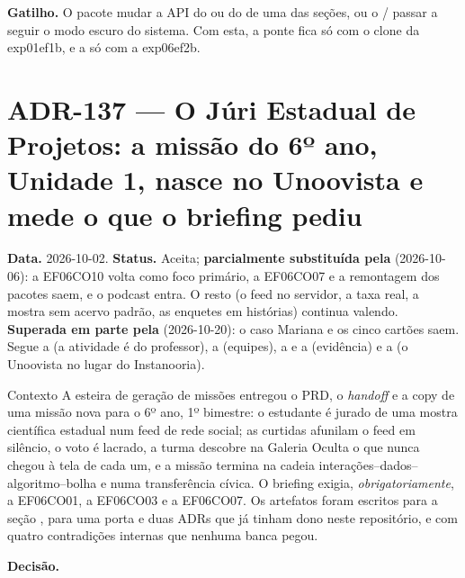 \textbf{Gatilho.} O pacote mudar a API do  ou do
 de uma das seções, ou o / passar
a seguir o modo escuro do sistema. Com esta, a ponte  fica
só com o clone da exp01ef1b, e a  só com a exp06ef2b.

\section{ADR-137 --- O Júri Estadual de Projetos: a missão do 6º ano, Unidade 1, nasce no Unoovista e mede o que o briefing pediu}
\label{adr:exp06ef1b-juri-estadual}

\textbf{Data.} 2026-10-02. \textbf{Status.} Aceita; \textbf{parcialmente
substituída pela } (2026-10-06): a EF06CO10 volta como foco
primário, a EF06CO07 e a remontagem dos pacotes saem, e o podcast entra. O
resto (o feed no servidor, a taxa real, a mostra sem acervo padrão, as
enquetes em histórias) continua valendo. \textbf{Superada em parte pela
} (2026-10-20): o caso Mariana e os cinco cartões saem. Segue a 
(a atividade é do professor), a  (equipes), a  e a
 (evidência) e a  (o Unoovista no lugar do
Instanooria).

\begin{especificacao}{Contexto}
A esteira de geração de missões entregou o PRD, o \emph{handoff} e a copy de
uma missão nova para o 6º ano, 1º bimestre: o estudante é jurado de uma mostra
científica estadual num feed de rede social; as curtidas afunilam o feed em
silêncio, o voto é lacrado, a turma descobre na Galeria Oculta o que nunca
chegou à tela de cada um, e a missão termina na cadeia
interações--dados--algoritmo--bolha e numa transferência cívica. O briefing
exigia, \emph{obrigatoriamente}, a EF06CO01, a EF06CO03 e a EF06CO07. Os
artefatos foram escritos para a seção , para uma porta e duas
ADRs que já tinham dono neste repositório, e com quatro contradições internas
que nenhuma banca pegou.
\end{especificacao}

\textbf{Decisão.}

